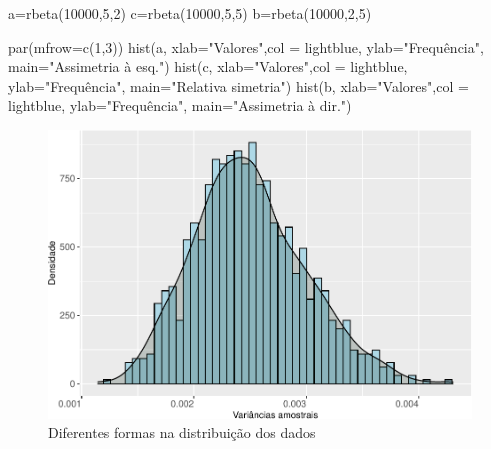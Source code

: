 \documentclass[
]{book}
\newenvironment{Shaded}{\begin{snugshade}}{\end{snugshade}}
\newcommand{\AttributeTok}[1]{\textcolor[rgb]{0.77,0.63,0.00}{#1}}
\newcommand{\DecValTok}[1]{\textcolor[rgb]{0.00,0.00,0.81}{#1}}
\newcommand{\FunctionTok}[1]{\textcolor[rgb]{0.00,0.00,0.00}{#1}}
\newcommand{\NormalTok}[1]{#1}
\newcommand{\OtherTok}[1]{\textcolor[rgb]{0.56,0.35,0.01}{#1}}
\newcommand{\StringTok}[1]{\textcolor[rgb]{0.31,0.60,0.02}{#1}}
\begin{document}
\begin{Shaded}
\begin{Highlighting}[]
\NormalTok{a}\OtherTok{=}\FunctionTok{rbeta}\NormalTok{(}\DecValTok{10000}\NormalTok{,}\DecValTok{5}\NormalTok{,}\DecValTok{2}\NormalTok{)}
\NormalTok{c}\OtherTok{=}\FunctionTok{rbeta}\NormalTok{(}\DecValTok{10000}\NormalTok{,}\DecValTok{5}\NormalTok{,}\DecValTok{5}\NormalTok{)}
\NormalTok{b}\OtherTok{=}\FunctionTok{rbeta}\NormalTok{(}\DecValTok{10000}\NormalTok{,}\DecValTok{2}\NormalTok{,}\DecValTok{5}\NormalTok{)}

\FunctionTok{par}\NormalTok{(}\AttributeTok{mfrow=}\FunctionTok{c}\NormalTok{(}\DecValTok{1}\NormalTok{,}\DecValTok{3}\NormalTok{))}
\FunctionTok{hist}\NormalTok{(a, }
     \AttributeTok{xlab=}\StringTok{"Valores"}\NormalTok{,}\AttributeTok{col =} \StringTok{\textquotesingle{}lightblue\textquotesingle{}}\NormalTok{,}
     \AttributeTok{ylab=}\StringTok{"Frequência"}\NormalTok{,}
     \AttributeTok{main=}\StringTok{"Assimetria à esq."}\NormalTok{)}
\FunctionTok{hist}\NormalTok{(c, }
     \AttributeTok{xlab=}\StringTok{"Valores"}\NormalTok{,}\AttributeTok{col =} \StringTok{\textquotesingle{}lightblue\textquotesingle{}}\NormalTok{,}
     \AttributeTok{ylab=}\StringTok{"Frequência"}\NormalTok{,}
     \AttributeTok{main=}\StringTok{"Relativa simetria"}\NormalTok{)}
\FunctionTok{hist}\NormalTok{(b, }
     \AttributeTok{xlab=}\StringTok{"Valores"}\NormalTok{,}\AttributeTok{col =} \StringTok{\textquotesingle{}lightblue\textquotesingle{}}\NormalTok{,}
     \AttributeTok{ylab=}\StringTok{"Frequência"}\NormalTok{,}
     \AttributeTok{main=}\StringTok{"Assimetria à dir."}\NormalTok{)}
\end{Highlighting}
\end{Shaded}

\begin{figure}

{\centering \includegraphics[width=0.8\linewidth]{apostila_files/figure-latex/unnamed-chunk-36-1} 

}

\caption{Diferentes formas na distribuição dos dados}\label{fig:unnamed-chunk-36}
\end{figure}
\end{document}
